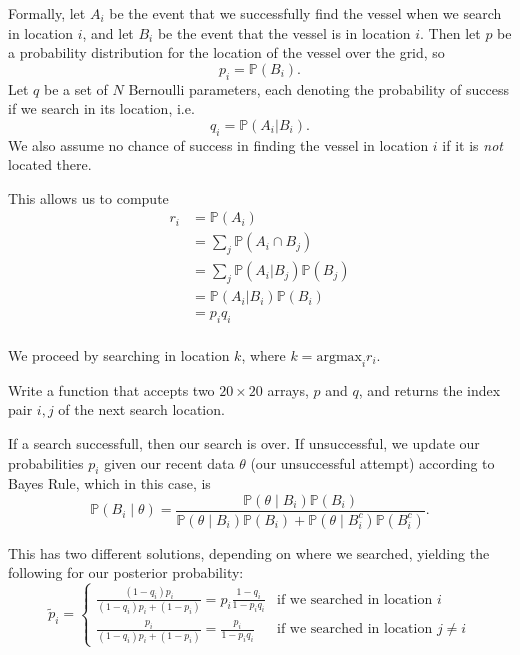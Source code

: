 Formally, let $A_{i}$ be the event that we successfully find the vessel when we search in location $i$, and let $B_{i}$ be the event that the vessel is in location $i$. Then let $p$ be a probability distribution for the location of the vessel over the grid, so $$p_{i} = \mathbb{P}(B_{i}).$$ Let $q$ be a set of $N$ Bernoulli parameters, each denoting the probability of success if we search in its location, i.e.
$$q_{i} = \mathbb{P}(A_{i} | B_{i}).$$ We also assume no chance of success in finding the vessel in location $i$ if it is \emph{not} located there.

This allows us to compute 
\begin{align*}
r_{i} & = \mathbb{P}(A_{i}) \\
& = \sum_{j} \mathbb{P}(A_{i} \cap B_{j}) \\
& = \sum_{j} \mathbb{P}(A_{i} | B_{j})\mathbb{P}(B_{j}) \\
& = \mathbb{P}(A_{i} | B_{i})\mathbb{P}(B_{i}) \\
& = p_{i}q_{i} \\
\end{align*}

We proceed by searching in location $k$, where $k = \text{argmax}_{i} r_{i}$.

\begin{problem}
Write a function that accepts two $20 \times 20$ arrays, $p$ and $q$, and returns the index pair $i,j$ of the next search location.
\end{problem}

If a search successfull, then our search is over. If unsuccessful, we update our probabilities $p_{i}$ given our recent data $\theta$ (our unsuccessful attempt) according to Bayes Rule, which in this case, is
$$\mathbb{P}(B_{i} \; | \; \theta) = \frac{\mathbb{P}(\theta \; | \; B_{i})\mathbb{P}(B_{i})}{\mathbb{P}(\theta \; | \; B_{i})\mathbb{P}(B_{i}) + \mathbb{P}(\theta \; | \; B_{i}^{c})\mathbb{P}(B_{i}^{c})}.$$

This has two different solutions, depending on where we searched, yielding the following for our posterior probability:
$$\tilde{p}_{i} = \begin{cases} \frac{(1-q_{i})p_{i}}{(1-q_{i})p_{i} + (1-p_{i})} = p_{i}\frac{1-q_{i}}{1-p_{i}q_{i}} & \mbox{if we searched in location } i \\ \frac{p_{i}}{(1-q_{i})p_{i} + (1-p_{i})} = \frac{p_{i}}{1-p_{i}q_{i}} & \mbox{if we searched in location } j \neq i \end{cases}$$

